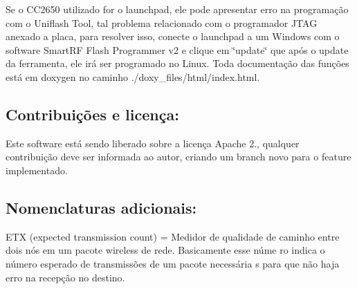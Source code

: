 Se o C\+C2650 utilizado for o launchpad, ele pode apresentar erro na programação com o Uniflash Tool, tal problema relacionado com o programador J\+T\+A\+G anexado a placa, para resolver isso, conecte o launchpad a um Windows com o software Smart\+R\+F Flash Programmer v2 e clique em \char`\"{}update\char`\"{} que após o update da ferramenta, ele irá ser programado no Linux. Toda documentação das funções está em doxygen no caminho ./doxy\+\_\+files/html/index.html.

\subsection*{Contribuições e licença\+:}

Este software está sendo liberado sobre a licença Apache 2., qualquer contribuição deve ser informada ao autor, criando um branch novo para o feature implementado.

\subsection*{Nomenclaturas adicionais\+:}

E\+T\+X (expected transmission count) = Medidor de qualidade de caminho entre dois nós em um pacote wireless de rede. Basicamente esse núme ro indica o número esperado de transmissões de um pacote necessária s para que não haja erro na recepção no destino. 